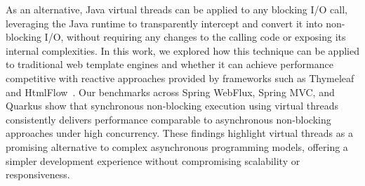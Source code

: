 \documentclass[software,article,accept,pdftex,moreauthors]{Definitions/mdpi}
\begin{document}
As an alternative, Java virtual threads can be applied to any blocking I/O call,
leveraging the Java runtime to transparently intercept and convert it into non-blocking I/O,
without requiring any changes to the calling code or exposing its internal complexities.
In this work, we explored how this technique can be applied to traditional
web template engines and whether it can achieve performance competitive with
reactive approaches provided by frameworks such as Thymeleaf~\cite{webflux} and HtmlFlow~\cite{htmlflow}.
Our benchmarks across Spring WebFlux, Spring MVC, and Quarkus show that synchronous
non-blocking execution using virtual threads consistently delivers performance
comparable to asynchronous non-blocking approaches under high concurrency.
These findings highlight virtual threads as a promising alternative to complex
asynchronous programming models, offering a simpler development experience
without compromising scalability or responsiveness.
\end{document}
